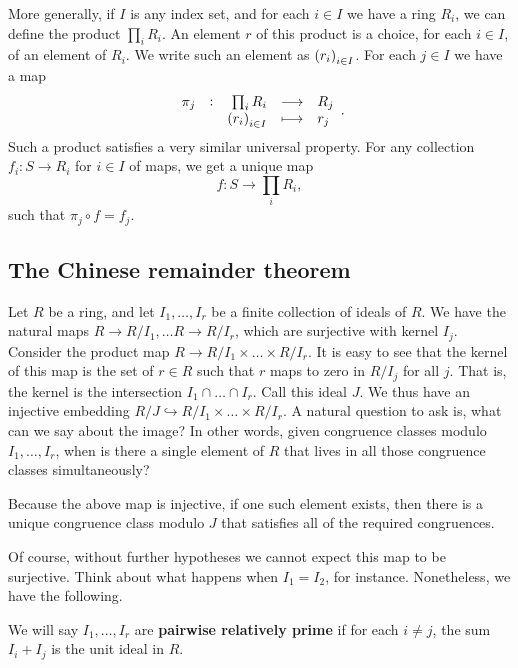 More generally, if $ I $ is any index set, and for each $ i \in I $ we have a ring $ R_i $, we can define the product $ \prod_i R_i $. An element $ r $ of this product is a choice, for each $ i \in I $, of an element of $ R_i $. We write such an element as $ \br{r_i}_{i \in I} $. For each $ j \in I $ we have a map
$$ \function[\pi_j]{\prod_i R_i}{R_j}{\br{r_i}_{i \in I}}{r_j}. $$
Such a product satisfies a very similar universal property. For any collection $ f_i : S \to R_i $ for $ i \in I $ of maps, we get a unique map
$$ f : S \to \prod_i R_i, $$
such that $ \pi_j \circ f = f_j $.

\subsection{The Chinese remainder theorem}

Let $ R $ be a ring, and let $ I_1, \dots, I_r $ be a finite collection of ideals of $ R $. We have the natural maps $ R \to R / I_1, \dots R \to R / I_r $, which are surjective with kernel $ I_j $. Consider the product map $ R \to R / I_1 \times \dots \times R / I_r $. It is easy to see that the kernel of this map is the set of $ r \in R $ such that $ r $ maps to zero in $ R / I_j $ for all $ j $. That is, the kernel is the intersection $ I_1 \cap \dots \cap I_r $. Call this ideal $ J $. We thus have an injective embedding $ R / J \hookrightarrow R / I_1 \times \dots \times R / I_r $. A natural question to ask is, what can we say about the image? In other words, given congruence classes modulo $ I_1, \dots, I_r $, when is there a single element of $ R $ that lives in all those congruence classes simultaneously?

\begin{note*}
Because the above map is injective, if one such element exists, then there is a unique congruence class modulo $ J $ that satisfies all of the required congruences.
\end{note*}

Of course, without further hypotheses we cannot expect this map to be surjective. Think about what happens when $ I_1 = I_2 $, for instance. Nonetheless, we have the following.

\begin{definition}
We will say $ I_1, \dots, I_r $ are \textbf{pairwise relatively prime} if for each $ i \ne j $, the sum $ I_i + I_j $ is the unit ideal in $ R $.
\end{definition}

\pagebreak

